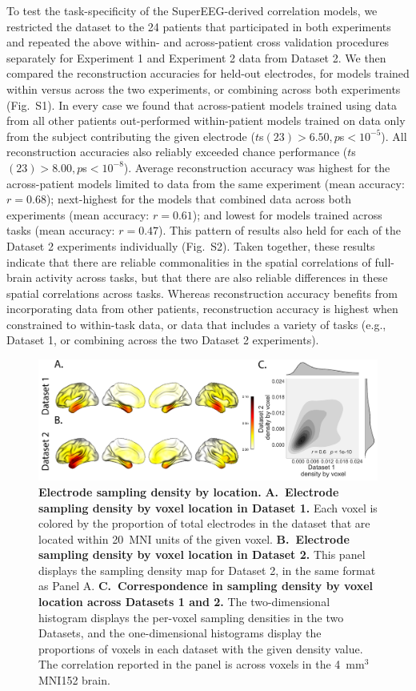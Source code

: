 \documentclass[11pt]{article}
\newcommand{\combinedexpviolins}{S1}
\newcommand{\splitexpviolins}{S2}
\begin{document}
To test the task-specificity of the SuperEEG-derived correlation models, we
restricted the dataset to the 24 patients that participated in both experiments
and repeated the above within- and across-patient cross validation procedures
separately for Experiment 1 and Experiment 2 data from Dataset 2.  We then
compared the reconstruction accuracies for held-out electrodes, for models
trained within versus across the two experiments, or combining across both
experiments (Fig.~\combinedexpviolins).  In every case we found that across-patient
models trained using data from all other patients out-performed within-patient
models trained on data only from the subject contributing the given electrode
($t$s$(23) > 6.50, p$s$ < 10^{-5}$). All reconstruction accuracies also reliably
exceeded chance performance ($t$s$(23) > 8.00, p$s$ < 10^{-8}$).  Average
reconstruction accuracy was highest for the across-patient models limited to
data from the same experiment (mean accuracy: $r = 0.68$); next-highest for the
models that combined data across both experiments (mean accuracy: $r = 0.61$); and
lowest for models trained across tasks (mean accuracy: $r = 0.47$).  This pattern of
results also held for each of the Dataset 2 experiments individually
(Fig.~\splitexpviolins).  Taken together, these results indicate that
there are reliable commonalities in the spatial correlations of full-brain
activity across tasks, but that there are also reliable differences in these
spatial correlations across tasks. Whereas reconstruction accuracy benefits from
incorporating data from other patients, reconstruction accuracy is highest when
constrained to within-task data, or data that includes a variety of tasks (e.g.,
Dataset 1, or combining across the two Dataset 2 experiments).

\begin{figure}
  \centering \includegraphics[width=\textwidth]{figs/density}
  \caption{\textbf{Electrode sampling density by location.} \textbf{A.~Electrode
  sampling density by voxel location in Dataset 1.} Each voxel is colored by the
  proportion of total electrodes in the dataset that are located within 20~MNI
  units of the given voxel.  \textbf{B.~Electrode sampling density by voxel
  location in Dataset 2.}  This panel displays the sampling density map for
  Dataset 2, in the same format as Panel A. \textbf{C.~Correspondence in
  sampling density by voxel location across Datasets 1 and 2.}  The
  two-dimensional histogram displays the per-voxel sampling densities in the two
  Datasets, and the one-dimensional histograms display the proportions of voxels
  in each dataset with the given density value.  The correlation reported in the
  panel is across voxels in the 4~mm$^3$ MNI152 brain.} \label{fig:density}
\end{figure}
\end{document}
